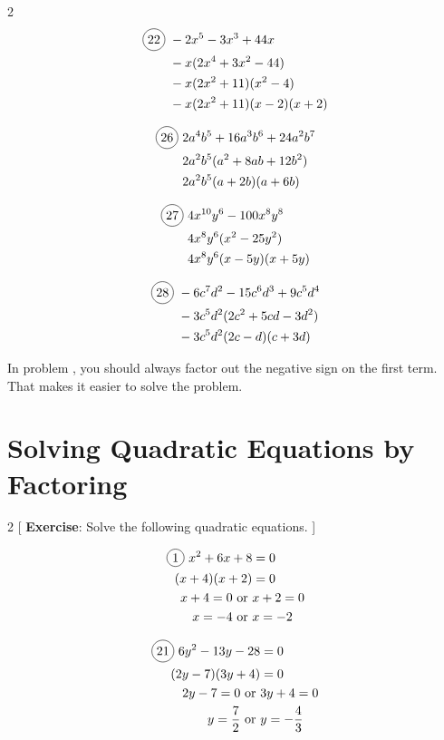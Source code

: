 \begin{multicols}{2}
\begin{align*}
  \circled{22}\ &-2x^{5}-3x^{3}+44x\\
  &-x(2x^{4}+3x^{2}-44)\\
  &-x(2x^{2}+11)(x^{2}-4)\\
  &-x(2x^{2}+11)(x-2)(x+2)
\end{align*}

\begin{align*}
  \circled{26}\ &2a^{4}b^{5}+16a^{3}b^{6}+24a^{2}b^{7}\\
  &2a^{2}b^{5}(a^{2}+8ab+12b^{2})\\
  &2a^{2}b^{5}(a+2b)(a+6b)\\
\end{align*}

\begin{align*}
  \circled{27}\ &4x^{10}y^{6}-100x^{8}y^{8}\\
  &4x^{8}y^{6}(x^{2}-25y^{2})\\
  &4x^{8}y^{6}(x-5y)(x+5y)\\
\end{align*}

\begin{align*}
  \circled{28}\ &-6c^{7}d^{2}-15c^{6}d^{3}+9c^{5}d^{4}\\
  &-3c^{5}d^{2}(2c^{2}+5cd-3d^{2})\\
  &-3c^{5}d^{2}(2c-d)(c+3d)\\
\end{align*}
\end{multicols}

In problem , you should always factor out the negative sign on the first term. That makes it easier to solve the problem.

\section{Solving Quadratic Equations by Factoring}

\begin{multicols}{2}
[
  \textbf{Exercise}: Solve the following quadratic equations.
]

\begin{align*}
  \circled{1}\ x^{2}+6x+8&=0\\
  (x+4)(x+2)&=0\\
  x+4=0 \text{ or }&x+2=0\\
  x=-4 \text{ or }&x=-2
\end{align*}

\begin{align*}
  \circled{21}\ 6y^{2}-13y-28&=0\\
  (2y-7)(3y+4)&=0\\
  2y-7=0 \text{ or }&3y+4=0\\
  y=\frac{7}{2} \text{ or }&y=-\frac{4}{3}
\end{align*}
\end{multicols}

